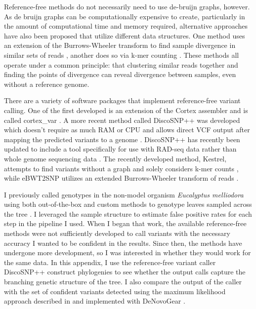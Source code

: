 Reference-free methods do not necessarily need to use de-bruijn graphs, however. As de bruijn graphs can be computationally expensive to create, particularly in the amount of computational time and memory required, alternative approaches have also been proposed that utilize different data structures. One method uses an extension of the Burrows-Wheeler transform to find sample divergence in similar sets of reads \parencite{prezza_snps_2019}, another does so via k-mer counting \parencite{audano_mapping-free_2018}. These methods all operate under a common  principle: that clustering similar reads together and finding the points of divergence can reveal divergence between samples, even without a reference genome.

There are a variety of software packages that implement reference-free variant calling. One of the first developed is an extension of the Cortex assembler and is called cortex\_var \parencite{iqbal_novo_2012}. A more recent method called DiscoSNP++ was developed which doesn't require as much RAM or CPU and allows direct VCF output after mapping the predicted variants to a genome \parencite{peterlongo_discosnp_2017}. DiscoSNP++ has recently been updated to include a tool specifically for use with RAD-seq data rather than whole genome sequencing data \parencite{gauthier_discosnp-rad_2020}. The recently developed method, Kestrel, attempts to find variants without a graph and solely considers k-mer counts \parencite{audano_mapping-free_2018}, while eBWT2SNP \parencite{prezza_snps_2019} utilizes an extended Burrows-Wheeler transform of reads \parencite{mantaci_extension_2007}.

I previously called genotypes in the non-model organism \textit{Eucalyptus melliodora} using both out-of-the-box and custom methods to genotype leaves sampled across the tree \parencite{orr_phylogenomic_2020}. I leveraged the sample structure to estimate false positive rates for each step in the pipeline I used. When I began that work, the available reference-free methods were not sufficiently developed to call variants with the necessary accuracy I wanted to be confident in the results. Since then, the methods have undergone more development, so I was interested in whether they would work for the same data. In this appendix, I use the reference-free variant caller DiscoSNP++ \parencite{peterlongo_discosnp_2017} construct phylogenies to see whether the output calls capture the branching genetic structure of the tree. I also compare the output of the caller with the set of confident variants detected using the maximum likelihood approach described in \parencite{orr_phylogenomic_2020} and implemented with DeNovoGear \parencite{ramu_denovogear_2013}.

